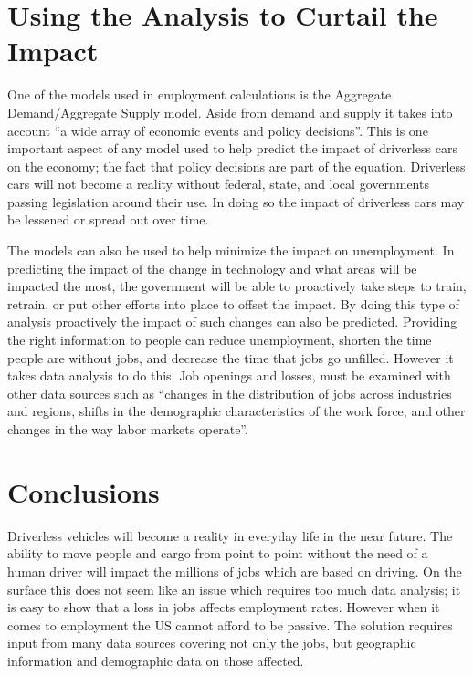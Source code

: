\documentclass[sigconf]{acmart}
\begin{document}
\section{Using the Analysis to Curtail the Impact}

One of the models used in employment calculations is the Aggregate 
Demand/Aggregate Supply model.  Aside from demand and supply it takes into 
account ``a wide array of economic events and policy decisions''.\cite{OpenStax} 
This is one important aspect of any model used to help predict the impact of 
driverless cars on the economy; the fact that policy decisions are part of 
the equation.  Driverless cars will not become a reality without federal, 
state, and local governments passing legislation around their use.  In doing 
so the impact of driverless cars may be lessened or spread out over time.  

The models can also be used to help minimize the impact on unemployment.  
In predicting the impact of the change in technology and what areas will 
be impacted the most, the government will be able to proactively take steps 
to train, retrain, or put other efforts into place to offset the impact.  
By doing this type of analysis proactively the impact of such changes can 
also be predicted.  Providing the right information to people can reduce 
unemployment, shorten the time people are without jobs, and decrease the 
time that jobs go unfilled.   However it takes data analysis to do this.  
Job openings and losses, must be examined with other data sources such 
as ``changes in the distribution of jobs across industries and regions, 
shifts in the demographic characteristics of the work force, and other 
changes in the way labor markets operate''.\cite{JOLTS}

\section{Conclusions}

Driverless vehicles will become a reality in everyday life in the near future.  
The ability to move people and cargo from point to point without the need of a 
human driver will impact the millions of jobs which are based on driving.  On 
the surface this does not seem like an issue which requires too much data 
analysis; it is easy to show that a loss in jobs affects employment rates.  
However when it comes to employment the US cannot afford to be passive.  The 
solution requires input from many data sources covering not only the jobs, 
but geographic information and demographic data on those affected.    
\end{document}
